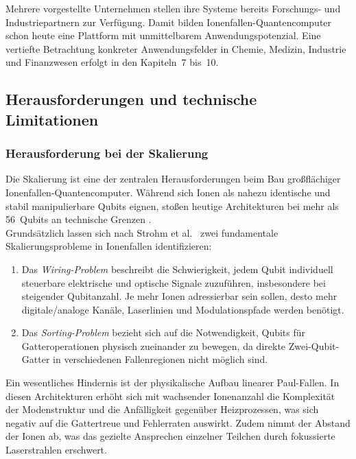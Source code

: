 Mehrere vorgestellte Unternehmen stellen ihre Systeme bereits Forschungs- und Industriepartnern zur Verfügung. Damit bilden Ionenfallen-Quantencomputer schon heute eine Plattform mit unmittelbarem Anwendungspotenzial. Eine vertiefte Betrachtung konkreter Anwendungsfelder in Chemie, Medizin, Industrie und Finanzwesen erfolgt in den Kapiteln~7 bis~10.

\subsection{Herausforderungen und technische Limitationen}
\subsubsection{Herausforderung bei der Skalierung}
Die Skalierung ist eine der zentralen Herausforderungen beim Bau großflächiger Ionenfallen-Quantencomputer. Während sich Ionen als nahezu identische und stabil manipulierbare Qubits eignen, stoßen heutige Architekturen bei mehr als 56~Qubits an technische Grenzen \cite{strohm2024, bischoff2024}. \\

Grundsätzlich lassen sich nach Strohm et al.\ \cite{strohm2024} zwei fundamentale Skalierungsprobleme in Ionenfallen identifizieren:
\begin{enumerate}
    \item Das \textit{Wiring-Problem} beschreibt die Schwierigkeit, jedem Qubit individuell steuerbare elektrische und optische Signale zuzuführen, insbesondere bei steigender Qubitanzahl. Je mehr Ionen adressierbar sein sollen, desto mehr digitale/analoge Kanäle, Laserlinien und Modulationspfade werden benötigt.
    \item Das \textit{Sorting-Problem} bezieht sich auf die Notwendigkeit, Qubits für Gatteroperationen physisch zueinander zu bewegen, da direkte Zwei-Qubit-Gatter in verschiedenen Fallenregionen nicht möglich sind.
\end{enumerate}

Ein wesentliches Hindernis ist der physikalische Aufbau linearer Paul-Fallen. In diesen Architekturen erhöht sich mit wachsender Ionenanzahl die Komplexität der Modenstruktur und die Anfälligkeit gegenüber Heizprozessen, was sich negativ auf die Gattertreue und Fehlerraten auswirkt. Zudem nimmt der Abstand der Ionen ab, was das gezielte Ansprechen einzelner Teilchen durch fokussierte Laserstrahlen erschwert. \\

